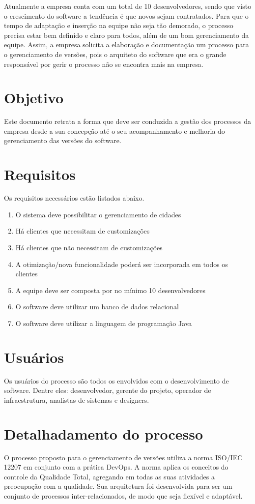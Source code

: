 \documentclass[	DIV=calc,%
							paper=a4,%
							fontsize=12pt,%
							onecolumn]{scrartcl}	 					%
\begin{document}
Atualmente a empresa conta com um total de 10 desenvolvedores, sendo que visto o crescimento do software a tendência é que novos sejam contratados. Para que o tempo de adaptação e inserção na equipe não seja tão demorado, o processo precisa estar bem definido e claro para todos, além de um bom gerenciamento da equipe. Assim, a empresa solicita a elaboração e documentação um processo para o gerenciamento de versões, pois o arquiteto do software que era o grande responsável por gerir o processo não se encontra mais na empresa. 


\section{Objetivo}
Este documento retrata a forma que deve ser conduzida a gestão dos processos da empresa desde a sua concepção até o seu acompanhamento e melhoria do gerenciamento das versões do software.

\section{Requisitos}
Os requisitos necessários estão listados abaixo.

\begin{enumerate}
	\item O sistema deve possibilitar o gerenciamento de cidades
	\item Há clientes que necessitam de customizações
	\item Há clientes que não necessitam de customizações
	\item A otimização/nova funcionalidade poderá ser incorporada em todos os clientes
	\item A equipe deve ser composta por no mínimo 10 desenvolvedores
	\item O software deve utilizar um banco de dados relacional 
	\item O software deve utilizar a linguagem de programação Java
\end{enumerate}

\section{Usuários}
Os usuários do processo são todos os envolvidos com o desenvolvimento de software. Dentre eles: desenvolvedor, gerente do projeto, operador de infraestrutura, analistas de sistemas e designers.

\section{Detalhadamento do processo }
O processo proposto para o gerenciamento de versões utiliza a norma ISO/IEC 12207 em conjunto com a prática DevOps.
A norma aplica os conceitos do controle da Qualidade Total, agregando em todas as suas atividades a preocupação com a qualidade. Sua arquitetura foi desenvolvida para ser um conjunto de processos inter-relacionados, de modo que seja flexível e adaptável.
\end{document}
